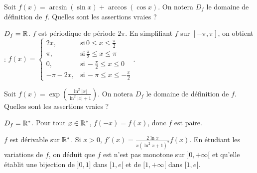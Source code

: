 \begin{question} 

Soit $f(x)= \arcsin (\sin x) + \arccos (\cos x)$. On notera $D_f$ le domaine de définition de $f$.  Quelles sont les assertions vraies ?
\begin{answers}


      
     
\end{answers}
\begin{explanations}
$D_f=\mathbb{R}$. $f$ est périodique de période $2\pi$. En simplifiant $f$ sur $[-\pi, \pi]$, on obtient : 
$f(x) = \left\{\begin{array}{cccc}2x,& \mbox{si} \, 0\le x \le \frac{\pi}{2} \\ \pi ,& \mbox{si} \,\frac{\pi}{2} \le x \le \pi \\  0 ,& \mbox{si} \,-\frac{\pi}{2} \le x \le 0 \\ -\pi-2x ,& \mbox{si} \, -\pi \le x \le - \frac{\pi}{2} \end{array}\right.$.

\end{explanations}

\end{question}




\begin{question} 

Soit $f(x)= \exp ( \frac{\ln^2 |x|}{\ln^2 |x|+1})$. On notera $D_f$ le domaine de définition de $f$.  Quelles sont les assertions vraies ?
\begin{answers}
    \bad{$D_f=]0,+\infty[$}



     \bad{$f$ est croissante sur $]0,+\infty[$.}
     
    \good{$f$ est une bijection de $]0,1]$ dans $[1,e[$.}

\end{answers}
\begin{explanations}
$D_f= \mathbb{R}^*$. Pour tout $x\in \mathbb{R}^*$, $f(-x)=f(x)$, donc $f$ est paire.

$f$ est dérivable sur $\mathbb{R}^*$. Si $x>0$,  $f'(x)= \frac{2\ln x}{x(\ln^2x+1)^2}f(x)$. En étudiant les variations de $f$, on déduit que $f$ est n'est pas monotone sur $]0,+\infty[$ et qu'elle établit une bijection de $]0,1]$ dans $[1,e[$ et de $[1,+\infty[$ dans $[1,e[$.

\end{explanations}

\end{question}





